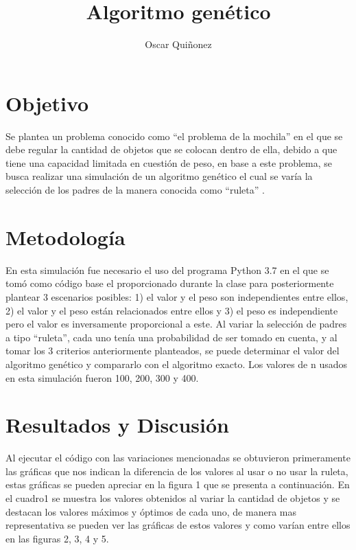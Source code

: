 \documentclass{article}
\title {Algoritmo gen\'etico}
\author{Oscar Qui\~nonez}
\begin{document}
\maketitle
 
\section{Objetivo}\label{met}

Se plantea un problema conocido como ``el problema de la mochila'' en el que se debe regular la cantidad de objetos que se colocan dentro de ella, debido a que tiene una capacidad limitada en cuesti\'on de peso, en base a este problema, se busca realizar una simulaci\'on de un algoritmo gen\'etico el cual se var\'ia la selecci\'on de los padres de la manera conocida como ``ruleta'' \cite{satuelisa}.  

\section{Metodolog\'ia}\label{met}

En esta simulaci\'on fue necesario el uso del programa Python 3.7 en el que se tom\'o como c\'odigo base el proporcionado durante la clase \cite{doctora} para posteriormente plantear 3 escenarios posibles: 1) el valor y el peso son independientes entre ellos, 2) el valor y el peso est\'an relacionados entre ellos y 3) el peso es independiente pero el valor es inversamente proporcional a este.
Al variar la selecci\'on de padres a tipo ``ruleta'', cada uno ten\'ia una probabilidad de ser tomado en cuenta, y al tomar los 3 criterios anteriormente planteados, se puede determinar el valor del algoritmo gen\'etico y compararlo con el algoritmo exacto. Los valores de n usados en esta simulaci\'on fueron 100, 200, 300 y 400.


\section{Resultados y Discusi\'on}\label{res}

Al ejecutar el c\'odigo con las variaciones mencionadas se obtuvieron primeramente las gr\'aficas que nos indican la diferencia de los valores al usar o no usar la ruleta, estas gr\'aficas se pueden apreciar en la figura 1 que se presenta a continuaci\'on.
En el cuadro1 se muestra los valores obtenidos al variar la cantidad de objetos y se destacan los valores m\'aximos y \'optimos de cada uno, de manera mas representativa se pueden ver las gr\'aficas de estos valores y como var\'ian entre ellos en las figuras 2, 3, 4 y 5.
\end{document}

